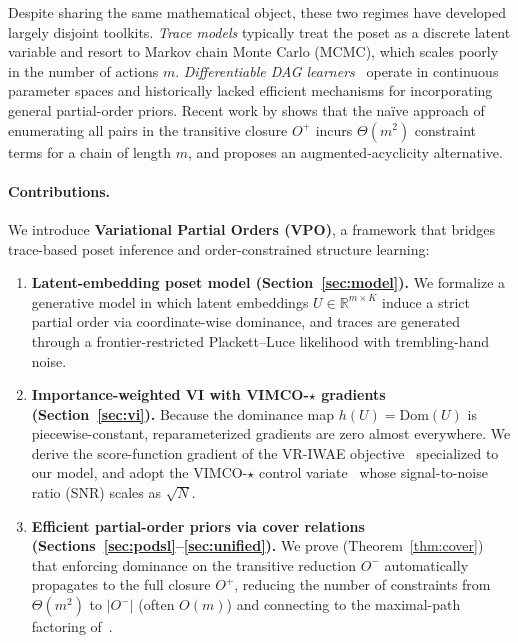 \documentclass{article}
\theoremstyle{definition}
\theoremstyle{remark}
\newcommand{\R}{\mathbb{R}}
\newcommand{\Dom}{\mathrm{Dom}}
\begin{document}
Despite sharing the same mathematical object, these two regimes have developed
largely disjoint toolkits.
\emph{Trace models} typically treat the poset as a discrete latent variable and
resort to Markov chain Monte Carlo (MCMC), which scales poorly in the number
of actions $m$.
\emph{Differentiable DAG learners}~\citep{zheng2018notears,bello2022dagma}
operate in continuous parameter spaces and historically lacked efficient
mechanisms for incorporating general partial-order priors.
Recent work by \citet{ban2024differentiable} shows that the na\"ive approach
of enumerating all pairs in the transitive closure $O^+$ incurs
$\Theta(m^2)$ constraint terms for a chain of length $m$, and proposes an
augmented-acyclicity alternative.

\paragraph{Contributions.}
We introduce \textbf{Variational Partial Orders (VPO)}, a framework that
bridges trace-based poset inference and order-constrained structure learning:

\begin{enumerate}[leftmargin=*,topsep=2pt,itemsep=1pt]
\item \textbf{Latent-embedding poset model (Section~\ref{sec:model}).}
  We formalize a generative model in which latent embeddings
  $U\in\R^{m\times K}$ induce a strict partial order via coordinate-wise
  dominance, and traces are generated through a frontier-restricted
  Plackett--Luce likelihood with trembling-hand noise.
\item \textbf{Importance-weighted VI with VIMCO-$\star$ gradients
  (Section~\ref{sec:vi}).}
  Because the dominance map $h(U)=\Dom(U)$ is piecewise-constant,
  reparameterized gradients are zero almost everywhere.
  We derive the score-function gradient of the VR-IWAE
  objective~\citep{burda2016iwae,daudel2026importance} specialized to our
  model, and adopt the VIMCO-$\star$ control variate~\citep{daudel2026importance}
  whose signal-to-noise ratio (SNR) scales as $\sqrt{N}$.
\item \textbf{Efficient partial-order priors via cover relations
  (Sections~\ref{sec:podsl}--\ref{sec:unified}).}
  We prove (Theorem~\ref{thm:cover}) that enforcing dominance on the
  transitive reduction $O^-$ automatically propagates to the full closure
  $O^+$, reducing the number of constraints from $\Theta(m^2)$ to $|O^-|$
  (often $O(m)$) and connecting to the maximal-path factoring
  of~\citet{ban2024differentiable}.
\end{enumerate}
\end{document}

